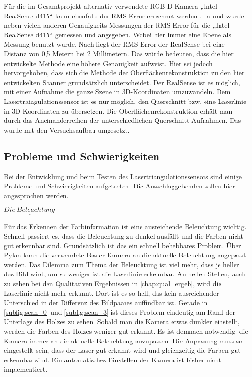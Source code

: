 		Für die im Gesamtprojekt alternativ verwendete RGB-D-Kamera „Intel RealSense d415“ kann ebenfalls der RMS Error errechnet werden \citep[vgl.][]{noauthor_camera_nodate-1}. In \citep[vgl.][]{grunnet-jepsen_tuning} und \citep[vgl.][]{visapp21} wurde neben vielen anderen Genauigkeits-Messungen der RMS Error für die „Intel RealSense d415“ gemessen und angegeben. Wobei hier immer eine Ebene als Messung benutzt wurde. Nach \citep[vgl.][]{visapp21} liegt der RMS Error der RealSense bei eine Distanz von 0,5 Metern bei 2 Millimetern. Das würde bedeuten, dass die hier entwickelte Methode eine höhere Genauigkeit aufweist. Hier sei jedoch hervorgehoben, dass sich die Methode der Oberflächenrekonstruktion zu den hier entwickelten Scanner grundsätzlich unterscheidet. Der RealSense ist es möglich, mit einer Aufnahme die ganze Szene in 3D-Koordinaten umzuwandeln. Dem Lasertraingulationssensor ist es nur möglich, den Querschnitt bzw. eine Laserlinie in 3D-Koordinaten zu übersetzen. Die Oberflächenrekonstruktion erhält man durch das Aneinanderreihen der unterschiedlichen Querschnitt-Aufnahmen. Das wurde mit den Versuchsaufbau umgesetzt.
		
		\subsection{Probleme und Schwierigkeiten}\label{chap:probleme_schwierigkeiten}
		Bei der Entwicklung und beim Testen des Lasertriangulationssensors sind einige Probleme und Schwierigkeiten aufgetreten. Die Ausschlaggebenden sollen hier angesprochen werden.
		
		$\underline{Die \; Beleuchtung}$
		
		Für das Erkennen der Farbinformation ist eine ausreichende Beleuchtung wichtig. Schnell passiert es, dass die Beleuchtung zu dunkel ausfällt und die Farben nicht gut erkennbar sind. Grundsätzlich ist das ein schnell behebbares Problem. Über Pylon kann die verwendete Basler-Kamera an die aktuelle Beleuchtung angepasst werden. Das Dilemma zum Thema der Beleuchtung ist viel mehr, dass je heller das Bild wird, um so weniger ist die Laserlinie erkennbar. An hellen Stellen, auch zu sehen bei den Qualitativen Ergebnissen in \ref{chap:qual_ergeb}, wird die Laserlinie nicht mehr erkannt. Dort ist es so hell, das kein ausreichender Unterschied in der Differenz des Bildpaares auffindbar ist. Gerade in \ref{subfig:scan_0} und \ref{subfig:scan_3} ist dieses Problem eindeutig am Rand der Unterlage des Holzes zu sehen. Sobald man die Kamera etwas dunkler einstellt, werden die Farben des Holzes weniger gut erkannt. Es ist demnach notwendig, die Kamera immer an die aktuelle Beleuchtung anzupassen. Die Anpassung muss so eingestellt sein, dass der Laser gut erkannt wird und gleichzeitig die Farben gut erkennbar sind. Ein automatisches Einstellen der Kamera ist bisher nicht implementiert.
		
